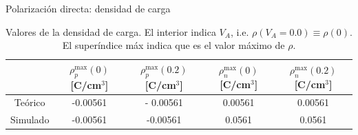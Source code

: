 \documentclass[aspectratio=169,xcolor=dvipsnames]{beamer}
\begin{document}
\begin{frame}{Polarización directa: densidad de carga}
        \begin{table}
            \caption{Valores de la densidad de carga. El interior indica $V_A$, i.e. $\rho(V_A=0.0)\equiv\rho(0)$. El superíndice máx indica que es el valor máximo de $\rho$.}
            \begin{tabular}{c|cc|cc}
                & $\rho_p^{\max} (0)$ \tiny{[C/cm$^{3}$]} & $\rho_p^{\max} (0.2)$ \tiny{[C/cm$^{3}$]}  & $\rho_n^{\max} (0)$ \tiny{[C/cm$^{3}$]}  & $\rho_n ^{\max} (0.2)$ \tiny{[C/cm$^{3}$]}  \\ \hline
                Teórico &  -0.00561 &- 0.00561 & 0.00561 & 0.00561 \\
                Simulado & -0.00561 & -0.00561 &  0.0561 & 0.0561
            \end{tabular}
        \end{table}
\end{frame}
\end{document}
